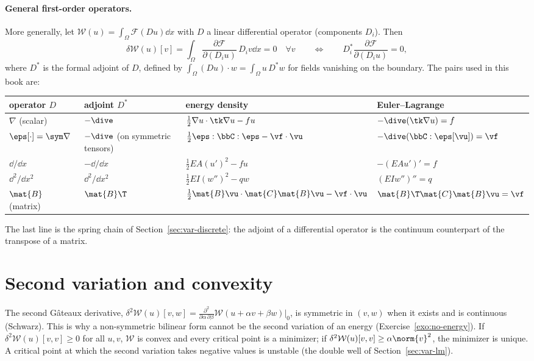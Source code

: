 \paragraph{General first-order operators.} More generally, let
%
$\mathcal W(u)=\int_\Omega\mathcal F(Du)\dd x$ with $D$ a linear differential
operator (components $D_i$). Then
\[
  \delta\mathcal W(u)[v]=\int_\Omega\frac{\partial\mathcal F}{\partial(D_iu)}\,D_iv\dd x=0
  \quad\forall v
  \qquad\Longleftrightarrow\qquad
  D_i^\ast\frac{\partial\mathcal F}{\partial(D_iu)}=0,
\]
where $D^\ast$ is the formal adjoint of $D$, defined by
$\int_\Omega(Du)\cdot w=\int_\Omega u\,D^\ast w$ for fields vanishing on the
boundary. The pairs used in this book are:
\begin{center}
\renewcommand{\arraystretch}{1.25}
\begin{tabular}{llll}
\toprule
\sffamily operator $D$ & \sffamily adjoint $D^\ast$ & \sffamily energy density & \sffamily Euler--Lagrange\\
\midrule
$\nabla$ (scalar) & $-\dive$ & $\tfrac12\nabla u\cdot\tk\nabla u-fu$ & $-\dive(\tk\nabla u)=f$\\
$\eps[\cdot]=\sym\nabla$ & $-\dive$ (on symmetric tensors) & $\tfrac12\eps:\bbC:\eps-\vf\cdot\vu$ & $-\dive(\bbC:\eps[\vu])=\vf$\\
$\dd/\dd x$ & $-\dd/\dd x$ & $\tfrac12EA(u')^2-fu$ & $-(EAu')'=f$\\
$\dd^2/\dd x^2$ & $\dd^2/\dd x^2$ & $\tfrac12EI(w'')^2-qw$ & $(EIw'')''=q$\\
$\mat{B}$ (matrix) & $\mat{B}\T$ & $\tfrac12\mat{B}\vu\cdot\mat{C}\mat{B}\vu-\vf\cdot\vu$ & $\mat{B}\T\mat{C}\mat{B}\vu=\vf$\\
\bottomrule
\end{tabular}
\end{center}
The last line is the spring chain of Section~\ref{sec:var-discrete}: the
adjoint of a differential operator is the continuum counterpart of the
transpose of a matrix.

\section{Second variation and convexity}
%
The second G\^ateaux derivative,
$\delta^2\mathcal W(u)[v,w]=\frac{\partial^2}{\partial\alpha\,\partial\beta}\mathcal W(u+\alpha v+\beta w)\big|_{0}$,
is symmetric in $(v,w)$ when it exists and is continuous (Schwarz). This is
why a non-symmetric bilinear form cannot be the second variation of an energy
(Exercise~\ref{exo:no-energy}). If $\delta^2\mathcal W(u)[v,v]\ge0$ for all
$u,v$, $\mathcal W$ is convex and every critical point is a minimizer; if
$\delta^2\mathcal W(u)[v,v]\ge\alpha\norm{v}^2$, the minimizer is unique. A
critical point at which the second variation takes negative values is
unstable (the double well of Section~\ref{sec:var-lm}).

